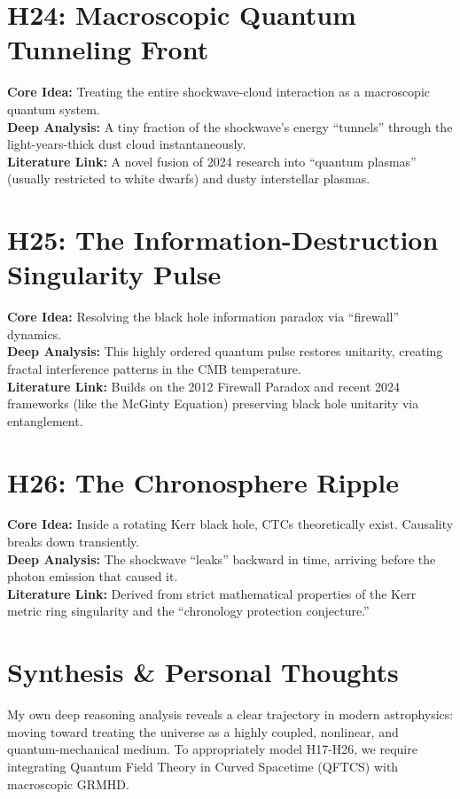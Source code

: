 \documentclass{article}
\begin{document}
\section*{H24: Macroscopic Quantum Tunneling Front}
\textbf{Core Idea:} Treating the entire shockwave-cloud interaction as a macroscopic quantum system. \\
\textbf{Deep Analysis:} A tiny fraction of the shockwave's energy ``tunnels'' through the light-years-thick dust cloud instantaneously. \\
\textbf{Literature Link:} A novel fusion of 2024 research into ``quantum plasmas'' (usually restricted to white dwarfs) and dusty interstellar plasmas.

\section*{H25: The Information-Destruction Singularity Pulse}
\textbf{Core Idea:} Resolving the black hole information paradox via ``firewall'' dynamics. \\
\textbf{Deep Analysis:} This highly ordered quantum pulse restores unitarity, creating fractal interference patterns in the CMB temperature. \\
\textbf{Literature Link:} Builds on the 2012 Firewall Paradox and recent 2024 frameworks (like the McGinty Equation) preserving black hole unitarity via entanglement.

\section*{H26: The Chronosphere Ripple}
\textbf{Core Idea:} Inside a rotating Kerr black hole, CTCs theoretically exist. Causality breaks down transiently. \\
\textbf{Deep Analysis:} The shockwave ``leaks'' backward in time, arriving before the photon emission that caused it. \\
\textbf{Literature Link:} Derived from strict mathematical properties of the Kerr metric ring singularity and the ``chronology protection conjecture.''

\section*{Synthesis \& Personal Thoughts}
My own deep reasoning analysis reveals a clear trajectory in modern astrophysics: moving toward treating the universe as a highly coupled, nonlinear, and quantum-mechanical medium. To appropriately model H17-H26, we require integrating Quantum Field Theory in Curved Spacetime (QFTCS) with macroscopic GRMHD.
\end{document}
